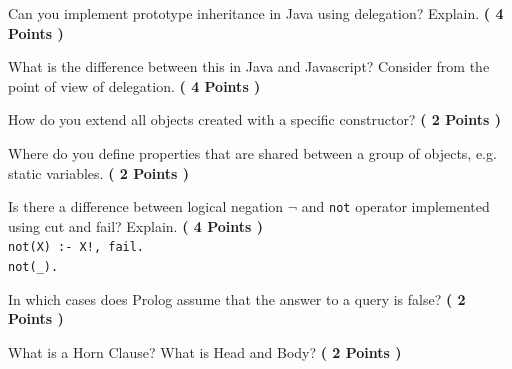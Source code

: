 \documentclass [11pt, a4wide, twoside]{article}
\begin{document}
\begin{myenumerate}

\item Can you implement prototype inheritance in Java using delegation? Explain. \textbf{( 4 Points )}
 \vspace{2.5cm}

\item What is the difference between this in Java and Javascript? Consider from the point of view of delegation. \textbf{( 4 Points )}
 \vspace{2.5cm}

\item How do you extend all objects created with a specific constructor?  \textbf{( 2 Points )}

\item Where do you define properties that are shared between a group of objects, e.g. static variables. \textbf{( 2 Points )}

\item Is there a difference between logical negation \texttt{$\neg$} and \texttt{not} operator implemented using cut and fail? Explain. \textbf{( 4 Points )} \\
\texttt{not(X) :- X!, fail. } \\
\texttt{not(\_).}
 \vspace{2.5cm}

\item In which cases does Prolog assume that the answer to a query is false? \textbf{( 2 Points )}

\item What is a Horn Clause? What is Head and Body? \textbf{( 2 Points )}
\end{myenumerate}
\end{document}

